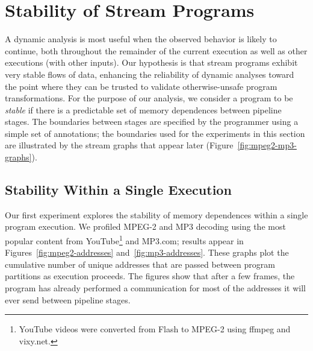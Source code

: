 
\section{Stability of Stream Programs}
\label{sec:stability}

A dynamic analysis is most useful when the observed behavior is likely
to continue, both throughout the remainder of the current execution as
well as other executions (with other inputs).  Our hypothesis is that
stream programs exhibit very stable flows of data, enhancing the
reliability of dynamic analyses toward the point where they can be
trusted to validate otherwise-unsafe program transformations.  For the
purpose of our analysis, we consider a program to be {\it stable} if
there is a predictable set of memory dependences between pipeline
stages.  The boundaries between stages are specified by the programmer
using a simple set of annotations; the boundaries used for the
experiments in this section are illustrated by the stream graphs that
appear later (Figure~\ref{fig:mpeg2-mp3-graphs}).

\subsection*{Stability Within a Single Execution}

Our first experiment explores the stability of memory dependences
within a single program execution.  We profiled MPEG-2 and MP3
decoding using the most popular content from YouTube\footnote{YouTube
  videos were converted from Flash to MPEG-2 using ffmpeg and
  vixy.net.} and MP3.com; results appear in
Figures~\ref{fig:mpeg2-addresses} and~\ref{fig:mp3-addresses}.  These
graphs plot the cumulative number of unique addresses that are passed
between program partitions as execution proceeds.  The figures show
that after a few frames, the program has already performed a
communication for most of the addresses it will ever send between
pipeline stages.

